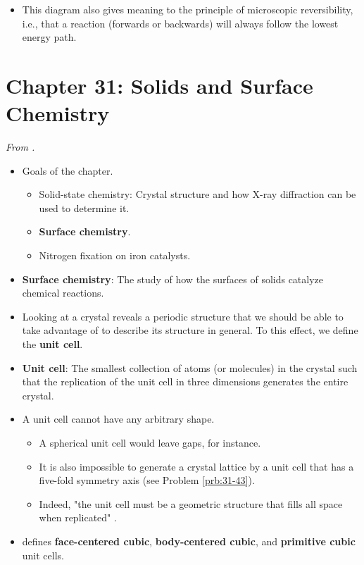 \documentclass[../notes.tex]{subfiles}
\begin{document}
\begin{itemize}
\begin{itemize}
        \item This diagram also gives meaning to the principle of microscopic reversibility, i.e., that a reaction (forwards or backwards) will always follow the lowest energy path.
    \end{itemize}
\end{itemize}



\section{Chapter 31: Solids and Surface Chemistry}
\emph{From \textcite{bib:McQuarrieSimon}.}
\begin{itemize}
    \item Goals of the chapter.
    \begin{itemize}
        \item Solid-state chemistry: Crystal structure and how X-ray diffraction can be used to determine it.
        \item \textbf{Surface chemistry}.
        \item Nitrogen fixation on iron catalysts.
    \end{itemize}
    \item \textbf{Surface chemistry}: The study of how the surfaces of solids catalyze chemical reactions.
    \item Looking at a crystal reveals a periodic structure that we should be able to take advantage of to describe its structure in general. To this effect, we define the \textbf{unit cell}.
    \item \textbf{Unit cell}: The smallest collection of atoms (or molecules) in the crystal such that the replication of the unit cell in three dimensions generates the entire crystal.
    \item A unit cell cannot have any arbitrary shape.
    \begin{itemize}
        \item A spherical unit cell would leave gaps, for instance.
        \item It is also impossible to generate a crystal lattice by a unit cell that has a five-fold symmetry axis (see Problem \ref{prb:31-43}).
        \item Indeed, "the unit cell must be a geometric structure that fills all space when replicated" \parencite[1272]{bib:McQuarrieSimon}.
    \end{itemize}
    \item \textcite{bib:McQuarrieSimon} defines \textbf{face-centered cubic}, \textbf{body-centered cubic}, and \textbf{primitive cubic} unit cells.

\end{itemize}
\end{document}
